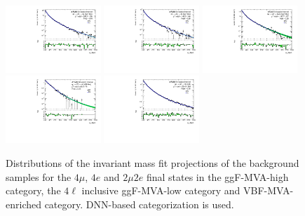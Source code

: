 \begin{figure}[htbp]
    \centering
    \includegraphics[width=0.32\textwidth]{figures/HMHZZ/background/dnn/bkg_shape_qqZZ_ggF_4mu_190_to_2200_log.pdf}
    \includegraphics[width=0.32\textwidth]{figures/HMHZZ/background/dnn/bkg_shape_qqZZ_ggF_4e_190_to_2200_log.pdf}
    \includegraphics[width=0.32\textwidth]{figures/HMHZZ/background/dnn/bkg_shape_qqZZ_ggF_2mu2e_190_to_2200_log.pdf} \\
    \includegraphics[width=0.32\textwidth]{figures/HMHZZ/background/dnn/bkg_shape_qqZZ_VBF_incl_190_to_2200_log.pdf}
    \includegraphics[width=0.32\textwidth]{figures/HMHZZ/background/dnn/bkg_shape_qqZZ_rest_190_to_2200_log.pdf}
    \caption{Distributions of the \mfl invariant mass fit projections of the \qqZZ background samples for the $4\mu$,
    $4e$ and $2\mu 2e$ final states in the ggF-MVA-high category, the $4\ell$ inclusive ggF-MVA-low category and VBF-MVA-enriched category.
    DNN-based categorization is used.} 
    \label{fig:qqZZ_m4l_shape_all_DNN}
\end{figure}

